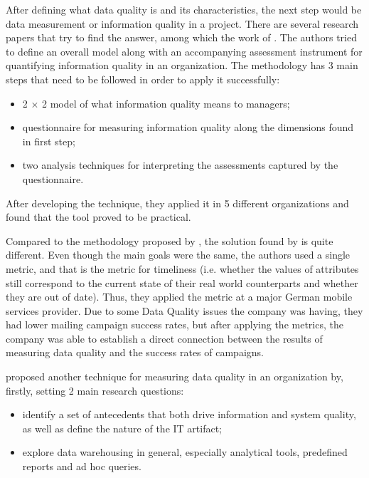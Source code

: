 \documentclass{mprop}
\begin{document}
After defining what data quality is and its characteristics, the next 
step would be data measurement or information quality in a project. 
There are several research papers that try to find the answer, among which the 
work of \citet{lee2002aimq}. The authors tried to define an overall model along 
with an accompanying assessment instrument for quantifying information quality 
in an organization. The methodology has 3 main steps that need to be followed 
in order to apply it successfully:
  \begin{itemize}
    \item 2 $\times$ 2 model of what information quality means to managers;
    \item questionnaire for measuring information quality along the dimensions
    found in first step;
    \item two analysis techniques for interpreting the assessments captured 
    by the questionnaire.
  \end{itemize} 
After developing the technique, they applied it in 5 different organizations and
found that the tool proved to be practical.

Compared to the methodology proposed by \citet{lee2002aimq}, the solution found
by \citet{Heinrich2007MetricsDataQuality} is quite different. Even though the 
main goals were the same, the authors used a single metric, and that is 
the metric for timeliness (i.e. whether the values of attributes still 
correspond to the current state of their real world counterparts and whether 
they are out of date). Thus, they applied the metric at a major German mobile 
services provider. Due to some Data Quality issues the company was having, they 
had lower mailing campaign success rates, but after applying the metrics, the 
company was able to establish a direct connection between the results of
measuring data quality and the success rates of campaigns.

\citet{nelson2005antecedents} proposed another technique for measuring data 
quality in an organization by, firstly, setting 2 main research questions:
  \begin{itemize}
    \item identify a set of antecedents that both drive information and
      system quality, as well as define the nature of the IT artifact;
    \item explore data warehousing in general, especially analytical tools,
      predefined reports and ad hoc queries.
  \end{itemize}
\end{document}
